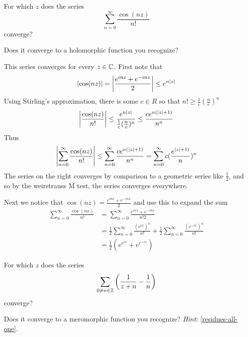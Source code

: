 \documentclass{homework}
\begin{document}
                \begin{problem}
                  For which $z$ does the series
                    \[
                        \sum_{n=0}^\infty \frac{\cos \left( nz \right)}{n!}
                          \]
                            converge?

                              Does it converge to a holomorphic function you recognize?
                              \end{problem}
                              \begin{solution}
                              This series converges for every $z\in \mathbb{C}$. First note that
                              \[
                              \left|\cos(nz)\right| = \left|\frac{e^{inz} + e^{-inz}}{2}\right| \leq e^{n\left|z\right|}
                              \]
                              Using Stirling's approximation, there is some $c\in R$ so that $n! \geq \frac{1}{c}(\frac{n}{e})^n$
                              \[
                              \left|\frac{\cos(nz)}{n!}\right| \leq \frac{e^{n\left|z\right|}}{\frac{1}{c}(\frac{n}{e})^n} \leq \frac{ce^{n(|z|+1)}}{n^n}
                              \]
                              Thus
                              \[
                              \left|\sum_{n=0}^\infty \frac{\cos(nz)}{n!}\right| \leq \sum_{n=0}^\infty \frac{ce^{n(|z|+1)}}{n^n}  = \sum_{n=0}^\infty c(\frac{e^{|z|+1)}}{n})^n
                              \]
                              The series on the right converges by comparison to a geometric series like $\frac{1}{2}$, and so by the weirstrauss M test, the series converges everywhere.

                              Next we notice that $\cos(nz) = \frac{e^{inx} + e^{-inx}}{2}$ and use this to expand the sum
                              \begin{align*}
                              \sum_{n=0}^\infty \frac{\cos(nx)}{n!} &= \sum_{n=0}^\infty \frac{e^{inx} + e^{-inx}}{n!2}\\
                              &= \frac{1}{2}\sum_{n=0}^\infty \frac{(e^{ix})^n}{n!} + \frac{1}{2}\sum_{n=0}^\infty \frac{(e^{-ix})^n}{n!}\\
                              &= \frac{1}{2}(e^{e^{ix}} + e^{e^{-ix}})
                              \end{align*}
                              \end{solution}
                              \begin{problem}\label{p4h10}
                                For which $z$ does the series
                                  \[
                                      \sum_{0 \neq n \in \mathbb{Z}} \left( \frac{1}{z+n} - \frac{1}{n} \right)
                                        \]
                                          converge?

                                            Does it converge to a meromorphic function you recognize?
                                              \textit{Hint:} \ref{residues-all-one}.
                                              \end{problem}
\end{document}
